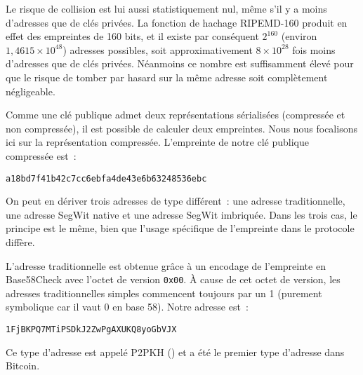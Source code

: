 Le risque de collision est lui aussi statistiquement nul, même s'il y a moins d'adresses que de clés privées. La fonction de hachage RIPEMD-160 produit en effet des empreintes de 160 bits, et il existe par conséquent $2^{160}$ (environ $1,4615 \times 10^{48}$) adresses possibles, soit approximativement $8 \times 10^{28}$ fois moins d'adresses que de clés privées. Néanmoins ce nombre est suffisamment élevé pour que le risque de tomber par hasard sur la même adresse soit complètement négligeable.

Comme une clé publique admet deux représentations sérialisées (compressée et non compressée), il est possible de calculer deux empreintes. Nous nous focalisons ici sur la représentation compressée. L'empreinte de notre clé publique compressée est~:

\begin{Verbatim}[fontsize=\footnotesize]
a18bd7f41b42c7cc6ebfa4de43e6b63248536ebc
\end{Verbatim}

On peut en dériver trois adresses de type différent~: une adresse traditionnelle, une adresse SegWit native et une adresse SegWit imbriquée. Dans les trois cas, le principe est le même, bien que l'usage spécifique de l'empreinte dans le protocole diffère.

L'adresse traditionnelle est obtenue grâce à un encodage de l'empreinte en Base58Check avec l'octet de version \texttt{0x00}. À cause de cet octet de version, les adresses traditionnelles simples commencent toujours par un 1 (purement symbolique car il vaut 0 en base 58). Notre adresse est~:

\begin{Verbatim}[fontsize=\small]
1FjBKPQ7MTiPSDkJ2ZwPgAXUKQ8yoGbVJX
\end{Verbatim}

Ce type d'adresse est appelé P2PKH () et a été le premier type d'adresse dans Bitcoin.

